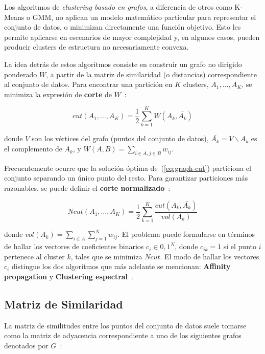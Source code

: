 Los algoritmos de \textit{clustering basado en grafos}, a diferencia de otros como K-Means o GMM, no aplican un modelo matemático particular para representar el conjunto de datos, o minimizan directamente una función objetivo.
Esto les permite aplicarse en escenarios de mayor complejidad y, en algunos casos, pueden producir clusters de estructura no necesariamente convexa.

La idea detrás de estos algoritmos consiste en construir un grafo no dirigido ponderado $W$, a partir de la matriz de similaridad (o distancias) correspondiente al conjunto de datos.
Para encontrar una partición en $K$ clusters, $A_1,\dots,A_K$, se minimiza la expresión de \textbf{corte} de $W$~\cite{Murphy12}:

\begin{equation}
    \label{eq:graph-cut}
    cut(A_1,\dots,A_K) = \frac{1}{2}\sum_{k=1}^{K}{W(A_k,\bar{A_k})}
\end{equation}

\noindent
donde $V$ son los vértices del grafo (puntos del conjunto de datos), $\bar{A_k}=V\backslash A_k$ es el complemento de $A_k$, y $W(A,B) = \sum_{i\in A, j \in B}{w_{ij}}$.

Frecuentemente ocurre que la solución óptima de~(\ref{eq:graph-cut}) particiona el conjunto separando un único punto del resto.
Para garantizar particiones más razonables, se puede definir el \textbf{corte normalizado}~\cite{Murphy12}:

\begin{equation}
    \label{eq:normalized-cut}
    Ncut(A_1,\dots,A_K) = \frac{1}{2}\sum_{k=1}^{K}{\frac{cut(A_k,\bar{A_k})}{vol(A_k)}}
\end{equation}

\noindent
donde $vol(A_k)=\sum_{i\in A}\sum_{j=1}^{N}{w_{ij}}$.
El problema puede formularse en términos de hallar los vectores de coeficientes binarios $c_i\in{0,1}^N$, donde $c_{ik} = 1$ si el punto $i$ pertenece al cluster $k$, tales que se minimiza $Ncut$.
El modo de hallar los vectores $c_i$ distingue los dos algoritmos que más adelante se mencionan: \textbf{Affinity propagation} y \textbf{Clustering espectral}~\cite{Murphy12}.

\subsection{Matriz de Similaridad}\label{subsec:matrizDeSimilaridad}

La matriz de similitudes entre los puntos del conjunto de datos suele tomarse como la matriz de adyacencia correspondiente a uno de los siguientes grafos denotados por $G$~\cite{Luxburg07,Aggarawal13}:

